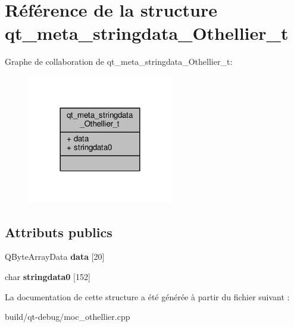 \hypertarget{structqt__meta__stringdata__Othellier__t}{}\section{Référence de la structure qt\+\_\+meta\+\_\+stringdata\+\_\+\+Othellier\+\_\+t}
\label{structqt__meta__stringdata__Othellier__t}


Graphe de collaboration de qt\+\_\+meta\+\_\+stringdata\+\_\+\+Othellier\+\_\+t\+:
\nopagebreak
\begin{figure}[H]
\begin{center}
\leavevmode
\includegraphics[width=180pt]{structqt__meta__stringdata__Othellier__t__coll__graph}
\end{center}
\end{figure}
\subsection*{Attributs publics}
\begin{DoxyCompactItemize}
\item 
Q\+Byte\+Array\+Data {\bfseries data} \mbox{[}20\mbox{]}\hypertarget{structqt__meta__stringdata__Othellier__t_a8366afd4e9a87b9460be4a389b3a3a0d}{}\label{structqt__meta__stringdata__Othellier__t_a8366afd4e9a87b9460be4a389b3a3a0d}

\item 
char {\bfseries stringdata0} \mbox{[}152\mbox{]}\hypertarget{structqt__meta__stringdata__Othellier__t_a607c75b6c6c976aff6c70f92740735df}{}\label{structqt__meta__stringdata__Othellier__t_a607c75b6c6c976aff6c70f92740735df}

\end{DoxyCompactItemize}


La documentation de cette structure a été générée à partir du fichier suivant \+:\begin{DoxyCompactItemize}
\item 
build/qt-\/debug/moc\+\_\+othellier.\+cpp\end{DoxyCompactItemize}

